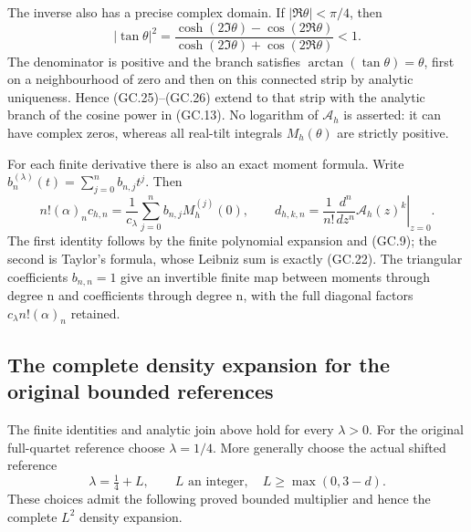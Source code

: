 The inverse also has a precise complex domain. If
$|\Re\theta|<\pi/4$, then
\[
 |\tan\theta|^2=
 \frac{\cosh(2\Im\theta)-\cos(2\Re\theta)}
      {\cosh(2\Im\theta)+\cos(2\Re\theta)}<1.
\]
The denominator is positive and the branch satisfies
$\arctan(\tan\theta)=\theta$, first on a neighbourhood of zero
and then on this connected strip by analytic uniqueness. Hence
(GC.25)--(GC.26) extend to that strip with the analytic branch of
the cosine power in (GC.13). No logarithm of $\mathcal A_h$ is
asserted: it can have complex zeros, whereas all real-tilt integrals
$M_h(\theta)$ are strictly positive.

For each finite derivative there is also an exact moment formula.
Write $b_n^{(\lambda)}(t)=\sum_{j=0}^n b_{n,j}t^j$. Then
\[
 n!(\alpha)_nc_{h,n}
  =\frac1{c_\lambda}\sum_{j=0}^n b_{n,j}M_h^{(j)}(0),\qquad
 d_{h,k,n}=\frac1{n!}
      \left.\frac{d^n}{dz^n}\mathcal A_h(z)^k\right|_{z=0}.
                                                               \tag{GC.30}
\]
The first identity follows by the finite polynomial expansion and
(GC.9); the second is Taylor's formula, whose Leibniz sum is
exactly (GC.22). The triangular coefficients $b_{n,n}=1$ give an
invertible finite map between moments through degree n and coefficients
through degree n, with the full diagonal factors
$c_\lambda n!(\alpha)_n$ retained.

\subsection{The complete density expansion for the original bounded references}

The finite identities and analytic join above hold for every
$\lambda>0$. For the original full-quartet reference choose
$\lambda=1/4$. More generally choose the actual shifted reference
\[
 \lambda=\tfrac14+L,\qquad
 L\text{ an integer},\quad L\ge\max(0,3-d).                    \tag{GC.31}
\]
These choices admit the following proved bounded multiplier and hence
the complete $L^2$ density expansion.

